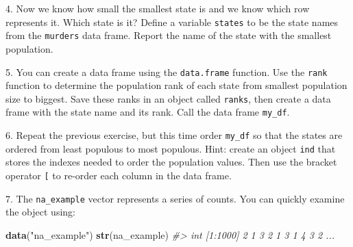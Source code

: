 \documentclass[
]{krantz}
\newenvironment{Shaded}{\begin{snugshade}}{\end{snugshade}}
\newcommand{\CommentTok}[1]{\textcolor[rgb]{0.37,0.37,0.37}{\textit{#1}}}
\newcommand{\DataTypeTok}[1]{\textcolor[rgb]{0.27,0.27,0.27}{#1}}
\newcommand{\KeywordTok}[1]{\textcolor[rgb]{0.27,0.27,0.27}{\textbf{#1}}}
\newcommand{\NormalTok}[1]{#1}
\newcommand{\OperatorTok}[1]{\textcolor[rgb]{0.43,0.43,0.43}{\textbf{#1}}}
\newcommand{\StringTok}[1]{\textcolor[rgb]{0.5,0.5,0.5}{#1}}
\begin{document}
4. Now we know how small the smallest state is and we know which row represents it. Which state is it? Define a variable \texttt{states} to be the state names from the \texttt{murders} data frame. Report the name of the state with the smallest population.

\begin{Shaded}
\end{Shaded}

5. You can create a data frame using the \texttt{data.frame} function.
Use the \texttt{rank} function to determine the population rank of each state from smallest population size to biggest. Save these ranks in an object called \texttt{ranks}, then create a data frame with the state name and its rank. Call the data frame \texttt{my\_df}.

\begin{Shaded}
\end{Shaded}

6. Repeat the previous exercise, but this time order \texttt{my\_df} so that the states are ordered from least populous to most populous. Hint: create an object \texttt{ind} that stores the indexes needed to order the population values. Then use the bracket operator \texttt{{[}} to re-order each column in the data frame.

\begin{Shaded}
\end{Shaded}

7. The \texttt{na\_example} vector represents a series of counts. You can quickly examine the object using:

\begin{Shaded}
\begin{Highlighting}[]
\KeywordTok{data}\NormalTok{(}\StringTok{"na_example"}\NormalTok{)  }
\KeywordTok{str}\NormalTok{(na_example)}
\CommentTok{#>  int [1:1000] 2 1 3 2 1 3 1 4 3 2 ...}
\end{Highlighting}
\end{Shaded}
\end{document}
